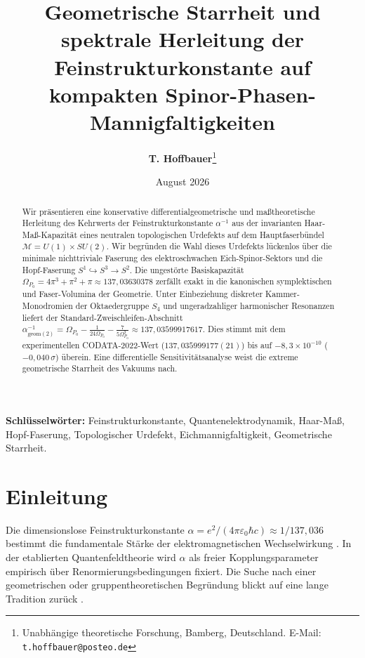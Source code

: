 \documentclass[11pt,a4paper]{article}
\title{\vspace{-0.8cm}\textbf{\Large Geometrische Starrheit und spektrale Herleitung der Feinstrukturkonstante auf kompakten Spinor-Phasen-Mannigfaltigkeiten}}
\author{\textbf{T. Hoffbauer}\thanks{Unabhängige theoretische Forschung, Bamberg, Deutschland. E-Mail: \texttt{t.hoffbauer@posteo.de}}}
\date{\small August 2026}
\begin{document}
\maketitle
\vspace{-0.4cm}

\begin{abstract}
\noindent Wir präsentieren eine konservative differentialgeometrische und maßtheoretische Herleitung des Kehrwerts der Feinstrukturkonstante $\alpha^{-1}$ aus der invarianten Haar-Maß-Kapazität eines neutralen topologischen Urdefekts auf dem Hauptfaserbündel $\mathcal{M} = U(1) \times SU(2)$. Wir begründen die Wahl dieses Urdefekts lückenlos über die minimale nichttriviale Faserung des elektroschwachen Eich-Spinor-Sektors und die Hopf-Faserung $S^1 \hookrightarrow S^3 \to S^2$. Die ungestörte Basiskapazität $\Omega_{P_0} = 4\pi^3 + \pi^2 + \pi \approx 137{,}03630378$ zerfällt exakt in die kanonischen symplektischen und Faser-Volumina der Geometrie. Unter Einbeziehung diskreter Kammer-Monodromien der Oktaedergruppe $S_4$ und ungeradzahliger harmonischer Resonanzen liefert der Standard-Zweischleifen-Abschnitt $\alpha_{\text{geom}(2)}^{-1} = \Omega_{P_0} - \frac{1}{24\Omega_{P_0}} - \frac{7}{5\Omega_{P_0}^3} \approx 137{,}03599917617$. Dies stimmt mit dem experimentellen CODATA-2022-Wert ($137{,}035999177(21)$) bis auf $-8{,}3 \times 10^{-10}$ ($-0{,}040\,\sigma$) überein. Eine differentielle Sensitivitätsanalyse weist die extreme geometrische Starrheit des Vakuums nach.
\end{abstract}

\vspace{0.2cm}
\noindent\textbf{Schlüsselwörter:} Feinstrukturkonstante, Quantenelektrodynamik, Haar-Maß, Hopf-Faserung, Topologischer Urdefekt, Eichmannigfaltigkeit, Geometrische Starrheit.

\section{Einleitung}
Die dimensionslose Feinstrukturkonstante $\alpha = e^2 / (4\pi \varepsilon_0 \hbar c) \approx 1/137{,}036$ bestimmt die fundamentale Stärke der elektromagnetischen Wechselwirkung \cite{codata2022}. In der etablierten Quantenfeldtheorie wird $\alpha$ als freier Kopplungsparameter empirisch über Renormierungsbedingungen fixiert. Die Suche nach einer geometrischen oder gruppentheoretischen Begründung blickt auf eine lange Tradition zurück \cite{wyler1969, eddington1936, gross1985}.
\end{document}
